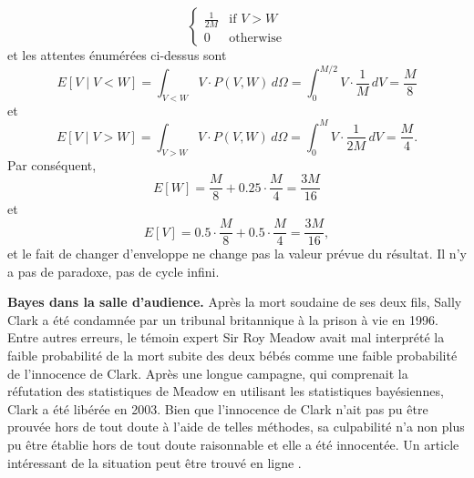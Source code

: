 \begin{Exemple}
$$\begin{cases}
\frac{1}{2M} & \text{if $V>W$} \\
0 & \text{otherwise}
\end{cases}$$
et les attentes \'enum\'er\'ees ci-dessus sont
$$E[V\mid V<W]=\int_{V<W}\!\!\!\!\!\!\!\!\!\!\! V\cdot P(V,W)\, d\Omega = \int_{0}^{M/2}\!\!\!\!\!\!\!\!V\cdot\frac{1}{M}\, dV=\frac{M}{8} $$ et $$E[V\mid V>W]=\int_{V>W}\!\!\!\!\!\!\!\!\!\!\! V\cdot P(V,W)\, d\Omega = \int_{0}^{M}\!\!\!\!V\cdot\frac{1}{2M}\, dV=\frac{M}{4}.$$ Par cons\'equent, $$E[W]=\frac{M}{8}+0.25\cdot \frac{M}{4}=\frac{3M}{16}$$ et $$E[V]=0.5\cdot \frac{M}{8}+0.5\cdot \frac{M}{4}=\frac{3M}{16},$$ et le fait de changer d'enveloppe ne change pas la valeur pr\'evue du r\'esultat. Il n'y a pas de paradoxe, pas de cycle infini.
\end{Exemple}

\begin{Exemple} \textbf{ Bayes dans la salle d'audience.} Apr\`es la mort soudaine de ses deux fils, Sally Clark a \'et\'e condamn\'ee par un tribunal britannique \`a la prison \`a vie en 1996. Entre autres erreurs, le t\'emoin expert Sir Roy Meadow avait mal interpr\'et\'e la faible probabilit\'e de la mort subite des deux b\'eb\'es comme une faible probabilit\'e de l'innocence de Clark. Apr\`es une longue campagne, qui comprenait la r\'efutation des statistiques de Meadow en utilisant les statistiques bay\'esiennes, Clark a \'et\'e lib\'er\'ee en 2003. Bien que l'innocence de Clark n'ait pas pu être prouv\'ee hors de tout doute \`a l'aide de telles m\'ethodes, sa culpabilit\'e n'a non plus pu être \'etablie hors de tout doute raisonnable et elle a \'et\'e innocent\'ee. Un article int\'eressant de la situation peut être trouv\'e en ligne \cite{BDA_NNN}.
\end{Exemple}

